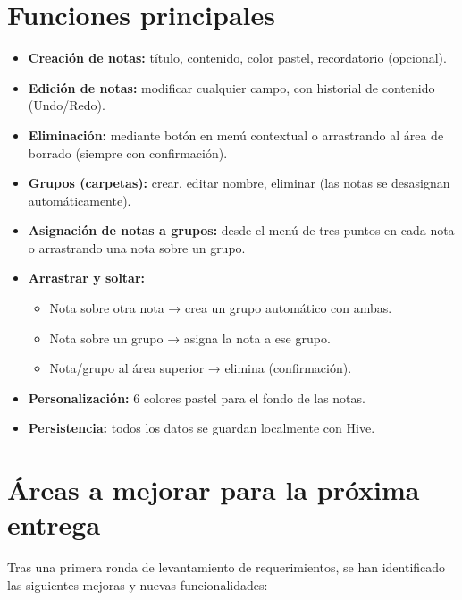 \documentclass[12pt,a4paper]{article}
\begin{document}
\section{Funciones principales}
\begin{itemize}
    \item \textbf{Creación de notas:} título, contenido, color pastel, recordatorio (opcional).
    \item \textbf{Edición de notas:} modificar cualquier campo, con historial de contenido (Undo/Redo).
    \item \textbf{Eliminación:} mediante botón en menú contextual o arrastrando al área de borrado (siempre con confirmación).
    \item \textbf{Grupos (carpetas):} crear, editar nombre, eliminar (las notas se desasignan automáticamente).
    \item \textbf{Asignación de notas a grupos:} desde el menú de tres puntos en cada nota o arrastrando una nota sobre un grupo.
    \item \textbf{Arrastrar y soltar:}
        \begin{itemize}
            \item Nota sobre otra nota → crea un grupo automático con ambas.
            \item Nota sobre un grupo → asigna la nota a ese grupo.
            \item Nota/grupo al área superior → elimina (confirmación).
        \end{itemize}
    \item \textbf{Personalización:} 6 colores pastel para el fondo de las notas.
    \item \textbf{Persistencia:} todos los datos se guardan localmente con Hive.
\end{itemize}

\section{Áreas a mejorar para la próxima entrega}
Tras una primera ronda de levantamiento de requerimientos, se han identificado las siguientes mejoras y nuevas funcionalidades:
\end{document}

